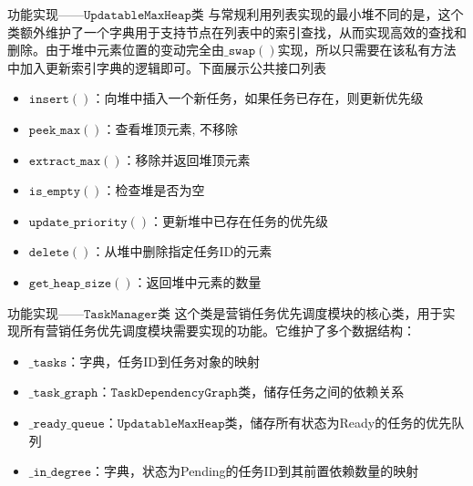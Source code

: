 \documentclass[aspectratio=169]{beamer}
\begin{document}
\begin{frame}{功能实现——$\mathtt{UpdatableMaxHeap}$类}
    与常规利用列表实现的最小堆不同的是，这个类额外维护了一个字典用于支持节点在列表中的索引查找，从而实现高效的查找和删除。由于堆中元素位置的变动完全由$\mathtt{\_swap()}$实现，所以只需要在该私有方法中加入更新索引字典的逻辑即可。下面展示公共接口列表
    \begin{itemize}
        \item $\mathtt{insert()}$：向堆中插入一个新任务，如果任务已存在，则更新优先级
        \item $\mathtt{peek\_max()}$：查看堆顶元素, 不移除
        \item $\mathtt{extract\_max()}$：移除并返回堆顶元素
        \item $\mathtt{is\_empty()}$：检查堆是否为空
        \item $\mathtt{update\_priority()}$：更新堆中已存在任务的优先级
        \item $\mathtt{delete()}$：从堆中删除指定任务ID的元素
        \item $\mathtt{get\_heap\_size()}$：返回堆中元素的数量
    \end{itemize}

\end{frame}

\begin{frame}{功能实现——$\mathtt{TaskManager}$类}
    这个类是营销任务优先调度模块的核心类，用于实现所有营销任务优先调度模块需要实现的功能。它维护了多个数据结构：
    \begin{itemize}
        \item $\mathtt{\_tasks}$：字典，任务ID到任务对象的映射
        \item $\mathtt{\_task\_graph}$：$\mathtt{TaskDependencyGraph}$类，储存任务之间的依赖关系
        \item $\mathtt{\_ready\_queue}$：$\mathtt{UpdatableMaxHeap}$类，储存所有状态为Ready的任务的优先队列
        \item $\mathtt{\_in\_degree}$：字典，状态为Pending的任务ID到其前置依赖数量的映射
    \end{itemize}
\end{frame}
\end{document}
